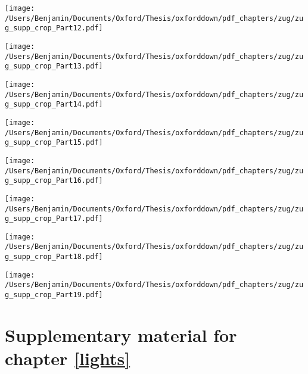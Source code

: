 \documentclass[a4paper, nobind]{templates/ociamthesis}
\begin{document}
 \begin{center} \texttt{[image: /Users/Benjamin/Documents/Oxford/Thesis/oxforddown/pdf\_chapters/zug/zug\_supp\_crop\_Part12.pdf]} \end{center} \newpage 
 \begin{center} \texttt{[image: /Users/Benjamin/Documents/Oxford/Thesis/oxforddown/pdf\_chapters/zug/zug\_supp\_crop\_Part13.pdf]} \end{center} \newpage 
 \begin{center} \texttt{[image: /Users/Benjamin/Documents/Oxford/Thesis/oxforddown/pdf\_chapters/zug/zug\_supp\_crop\_Part14.pdf]} \end{center} \newpage 
 \begin{center} \texttt{[image: /Users/Benjamin/Documents/Oxford/Thesis/oxforddown/pdf\_chapters/zug/zug\_supp\_crop\_Part15.pdf]} \end{center} \newpage 
 \begin{center} \texttt{[image: /Users/Benjamin/Documents/Oxford/Thesis/oxforddown/pdf\_chapters/zug/zug\_supp\_crop\_Part16.pdf]} \end{center} \newpage 
 \begin{center} \texttt{[image: /Users/Benjamin/Documents/Oxford/Thesis/oxforddown/pdf\_chapters/zug/zug\_supp\_crop\_Part17.pdf]} \end{center} \newpage 
 \begin{center} \texttt{[image: /Users/Benjamin/Documents/Oxford/Thesis/oxforddown/pdf\_chapters/zug/zug\_supp\_crop\_Part18.pdf]} \end{center} \newpage 
 \begin{center} \texttt{[image: /Users/Benjamin/Documents/Oxford/Thesis/oxforddown/pdf\_chapters/zug/zug\_supp\_crop\_Part19.pdf]} \end{center} \newpage

\hypertarget{app-lights-supp}{%
\chapter{Supplementary material for chapter \ref{lights}}\label{app-lights-supp}}

\newpage
\end{document}

